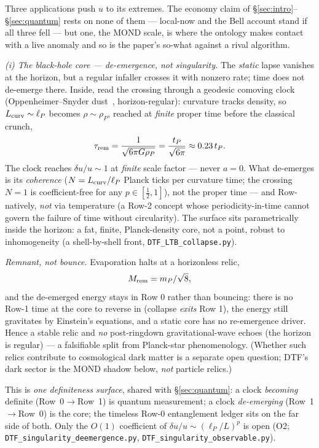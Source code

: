 \documentclass[11pt]{article}
\begin{document}
Three applications push $u$ to its extremes. The economy claim of \S\ref{sec:intro}--\S\ref{sec:quantum} rests on none of them --- local-now
and the Bell account stand if all three fell --- but one, the MOND scale, is where the ontology makes contact
with a live anomaly and so is the paper's so-what against a rival algorithm.

\emph{(i) The black-hole core --- de-emergence, not singularity.} The \emph{static} lapse vanishes at the
horizon, but a regular infaller crosses it with nonzero rate; time does not de-emerge there. Inside, read the
crossing through a geodesic comoving clock (Oppenheimer--Snyder dust~\cite{OppenheimerSnyder1939}, horizon-regular): curvature tracks
density, so $L_{\rm curv}\sim\ell_P$ becomes $\rho\sim\rho_P$, reached at \emph{finite} proper time before the
classical crunch,
\[
\tau_{\rm rem}=\frac{1}{\sqrt{6\pi G\rho_P}}=\frac{t_P}{\sqrt{6\pi}}\approx0.23\,t_P .
\]
The clock reaches $\delta u/u\sim1$ at \emph{finite} scale factor --- never $a=0$. What de-emerges is its
\emph{coherence} ($N=L_{\rm curv}/\ell_P$ Planck ticks per curvature time; the crossing $N=1$ is
coefficient-free for any $p\in[\tfrac12,1]$), not the proper time --- and Row-natively, \emph{not} via
temperature (a Row-2 concept whose periodicity-in-time cannot govern the failure of time without circularity).
The surface sits parametrically inside the horizon: a fat, finite, Planck-density core, not a point, robust to
inhomogeneity (a shell-by-shell front, \texttt{DTF\_LTB\_collapse.py}).

\emph{Remnant, not bounce.} Evaporation halts at a horizonless relic,
\[ M_{\rm rem}=m_P/\sqrt8 , \]
and the de-emerged energy stays in Row 0 rather than bouncing: there is no Row-1 time at the core to reverse in
(collapse \emph{exits} Row 1), the energy still gravitates by Einstein's equations, and a static core has no
re-emergence driver. Hence a stable relic and \emph{no} post-ringdown gravitational-wave echoes (the horizon is
regular) --- a falsifiable split from Planck-star phenomenology. (Whether such relics contribute to
cosmological dark matter is a separate open question; DTF's dark sector is the MOND shadow below, \emph{not}
particle relics.)

This is \emph{one definiteness surface}, shared with \S\ref{sec:quantum}: a clock \emph{becoming} definite (Row~0$\to$Row~1) is
quantum measurement; a clock \emph{de-emerging} (Row~1$\to$Row~0) is the core; the timeless Row-0 entanglement
ledger sits on the far side of both. Only the $O(1)$ coefficient of $\delta u/u\sim(\ell_P/L)^p$ is open (O2;
\texttt{DTF\_singularity\_deemergence.py}, \texttt{DTF\_singularity\_observable.py}).
\end{document}
